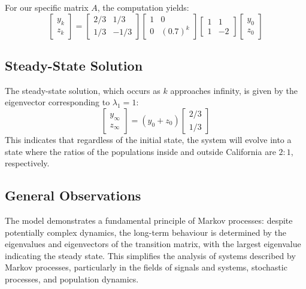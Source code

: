 For our specific matrix \( A \), the computation yields:
\begin{equation}
    \begin{bmatrix}
    y_k \\
    z_k 
    \end{bmatrix} = 
    \begin{bmatrix}
    2/3 & 1/3 \\
    1/3 & -1/3 
    \end{bmatrix}
    \begin{bmatrix}
    1 & 0 \\
    0 & (0.7)^k 
    \end{bmatrix}
    \begin{bmatrix}
    1 & 1 \\
    1 & -2 
    \end{bmatrix}
    \begin{bmatrix}
    y_0 \\
    z_0 
    \end{bmatrix}
\end{equation}

\subsection*{Steady-State Solution}

The steady-state solution, which occurs as \( k \) approaches infinity, is given by the eigenvector corresponding to \( \lambda_1 = 1 \):
\begin{equation}
    \begin{bmatrix}
    y_{\infty} \\
    z_{\infty} 
    \end{bmatrix} = 
    \left( y_0 + z_0 \right)
    \begin{bmatrix}
    2/3 \\
    1/3 
    \end{bmatrix}
\end{equation}
This indicates that regardless of the initial state, the system will evolve into a state where the ratios of the populations inside and outside California are \( 2:1 \), respectively.

\subsection*{General Observations}

The model demonstrates a fundamental principle of Markov processes: despite potentially complex dynamics, the long-term behaviour is determined by the eigenvalues and eigenvectors of the transition matrix, with the largest eigenvalue indicating the steady state. This simplifies the analysis of systems described by Markov processes, particularly in the fields of signals and systems, stochastic processes, and population dynamics.



